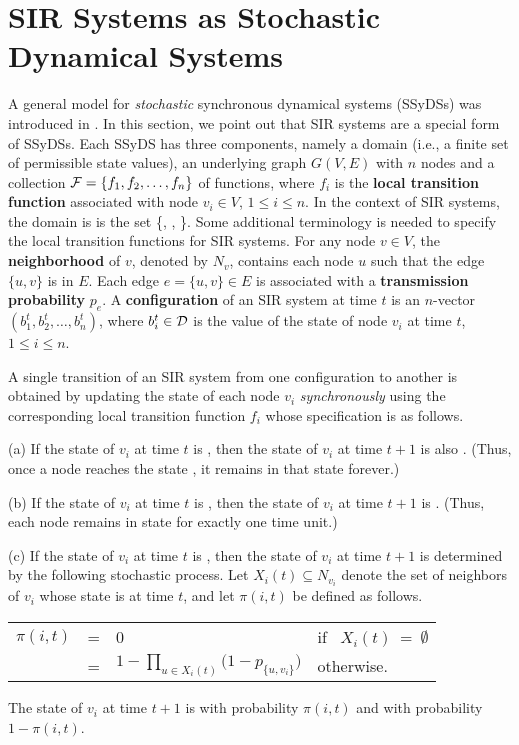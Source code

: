 \section{SIR Systems as Stochastic Dynamical Systems}
\label{sec:sir_dyn_system}

A general model for \emph{stochastic}
synchronous dynamical systems (SSyDSs) was introduced in \cite{BH+2011}.
In this section, we point out that SIR systems are a special form of SSyDSs.
Each SSyDS \cals{} has three components, namely a domain \cald{}
(i.e., a finite set of permissible state values),
an underlying graph $G(V,E)$ with $n$ nodes and 
a collection ${\cal F} = \{f_1, f_2, \ldots, f_n\}$ of functions,
where $f_i$ is the \textbf{local transition function}
associated with node $v_i \in V$,
$1 \leq i \leq n$.
In the context of SIR systems, the domain \cald{} is
is the set \{\sstate, \istate, \rstate\}.
Some additional terminology is needed to specify
the local transition functions for SIR systems. 
For any node $v \in V$, the \textbf{neighborhood} of $v$, denoted
by $N_v$, contains each node $u$ such that the edge $\{u,v\}$ is in $E$. 
Each edge $e = \{u,v\} \in E$ is associated with a 
\textbf{transmission probability} $p_e$. 
A {\bf configuration} of an SIR system at time $t$ is an $n$-vector   
$(b_1^t, b_2^t, \ldots, b_n^t)$,  
where $b_i^t \in \mbox{${\cal D}$}$ is the value of the state of 
node $v_i$ at time $t$, $1 \leq i \leq n$.  

A single transition of an SIR system from one configuration to another is   
obtained by updating the state of each node $v_i$ \emph{synchronously}
using the corresponding local transition function $f_i$ whose 
specification is as follows.
\begin{description}
\item{(a)} If the state of $v_i$ at time $t$ is \rstate, then
the state of $v_i$ at time $t+1$ is also \rstate.
(Thus, once a node reaches the state \rstate, it remains
in that state forever.)

\item{(b)} If the state of $v_i$ at time $t$ is \istate, then
the state of $v_i$ at time $t+1$ is \rstate.
(Thus, each node remains in state \istate{} for exactly one 
time unit.)

\item{(c)} If the state of $v_i$ at time $t$ is \sstate, then 
the state of $v_i$ at time $t+1$ is determined by the following 
stochastic process.
Let $X_i(t) \subseteq N_{v_i}$ denote the set of neighbors of 
$v_i$ whose state is \istate{} at time $t$, and
let $\pi(i,t)$ be defined as follows. 
\begin{center}
\begin{tabular}{lcll} 
$\pi(i,t)$  & = & 0 & \textrm{if}~ $X_i(t) ~=~ \emptyset$ \\ 
            & = & $1 - \displaystyle{\prod_{u \in X_i(t)} 
                         (1 - p_{\{u,v_i\}}})$ &
                \textrm{otherwise.} 
\end{tabular}
\end{center}
The state of $v_i$ at time $t+1$ is \istate{} 
with probability $\pi(i,t)$ and \sstate{} with probability $1 - \pi(i,t)$.
\end{description}

